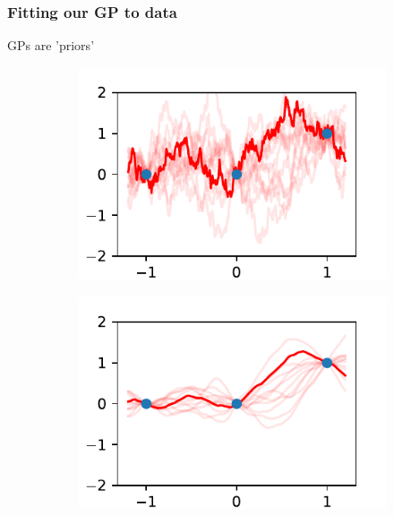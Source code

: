 \documentclass{beamer}
\begin{document}
\begin{frame}
    \frametitle{Fitting our GP to data}
    GPs are 'priors'
    \begin{figure}
        \centering
        \begin{subfigure}[t]{0.4\textwidth}
            \centering
            \includegraphics[width=\textwidth]{flatish_GP_matern_5.0_tenths.pdf}
        \end{subfigure}%
        \begin{subfigure}[t]{0.4\textwidth}
            \centering
            \includegraphics[width=\textwidth]{flatish_GP_matern_15.0_tenths.pdf}
        \end{subfigure}
        \begin{subfigure}[t]{0.4\textwidth}
            \centering

\end{subfigure}
\end{figure}
\end{frame}
\end{document}
